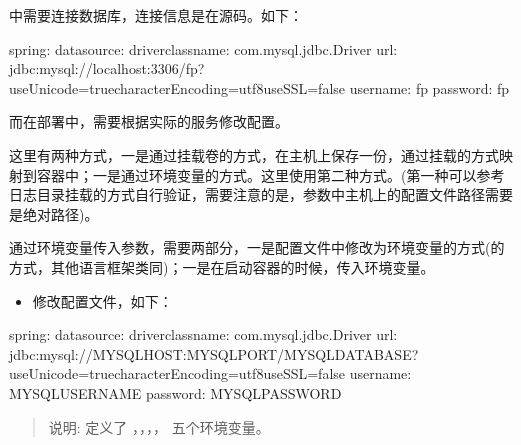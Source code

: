 \documentclass[letterpaper,10pt,english]{sphinxmanual}
\begin{document}
中需要连接数据库，连接信息是在源码。如下：

\begin{sphinxVerbatim}[commandchars=\\\{\}]
spring:
  datasource:
    driver\PYGZhy{}class\PYGZhy{}name: com.mysql.jdbc.Driver
    url: jdbc:mysql://localhost:3306/fp?useUnicode=true\PYGZam{}characterEncoding=utf\PYGZhy{}8\PYGZam{}useSSL=false
    username: fp
    password: fp
\end{sphinxVerbatim}

而在部署中，需要根据实际的服务修改配置。

这里有两种方式，一是通过挂载卷的方式，在主机上保存一份，通过挂载的方式映射到容器中；一是通过环境变量的方式。这里使用第二种方式。(第一种可以参考日志目录挂载的方式自行验证，需要注意的是，参数中主机上的配置文件路径需要是绝对路径)。

通过环境变量传入参数，需要两部分，一是配置文件中修改为环境变量的方式(的方式，其他语言框架类同)；一是在启动容器的时候，传入环境变量。
\begin{itemize}
\item {} 
修改配置文件，如下：

\end{itemize}

\begin{sphinxVerbatim}[commandchars=\\\{\}]
spring:
  datasource:
    driver\PYGZhy{}class\PYGZhy{}name: com.mysql.jdbc.Driver
    url: jdbc:mysql://\PYGZdl{}\PYGZob{}MYSQL\PYGZus{}HOST\PYGZcb{}:\PYGZdl{}\PYGZob{}MYSQL\PYGZus{}PORT\PYGZcb{}/\PYGZdl{}\PYGZob{}MYSQL\PYGZus{}DATABASE\PYGZcb{}?useUnicode=true\PYGZam{}characterEncoding=utf\PYGZhy{}8\PYGZam{}useSSL=false
    username: \PYGZdl{}\PYGZob{}MYSQL\PYGZus{}USERNAME\PYGZcb{}
    password: \PYGZdl{}\PYGZob{}MYSQL\PYGZus{}PASSWORD\PYGZcb{}
\end{sphinxVerbatim}
\begin{quote}

说明: 定义了 ，，，， 五个环境变量。
\end{quote}
\end{document}
